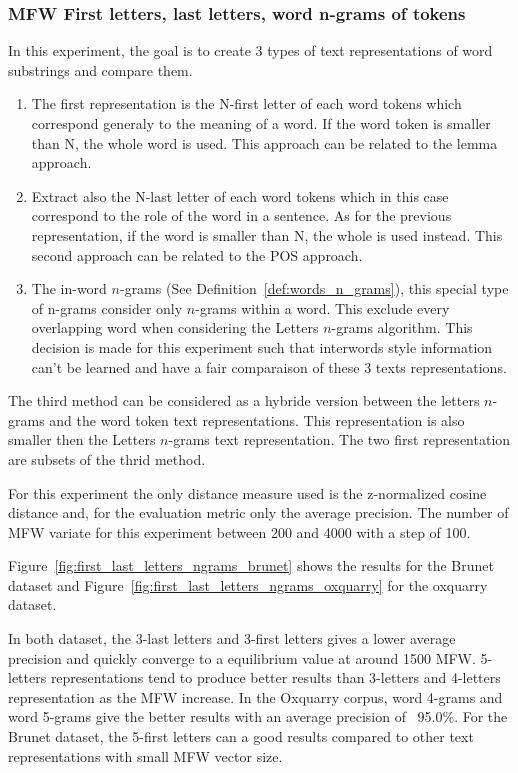 \subsubsection{MFW First letters, last letters, word n-grams of tokens}

In this experiment, the goal is to create 3 types of text representations of word substrings and compare them.

\begin{enumerate}
  \item
  The first representation is the N-first letter of each word tokens which correspond generaly to the meaning of a word.
  If the word token is smaller than N, the whole word is used.
  This approach can be related to the lemma approach.
  \item
  Extract also the N-last letter of each word tokens which in this case correspond to the role of the word in a sentence.
  As for the previous representation, if the word is smaller than N, the whole is used instead.
  This second approach can be related to the POS approach.
  \item
  The in-word $n$-grams (See Definition~\ref{def:words_n_grams}), this special type of n-grams consider only $n$-grams within a word.
  This exclude every overlapping word when considering the Letters $n$-grams algorithm.
  This decision is made for this experiment such that interwords style information can't be learned and have a fair comparaison of these 3 texts representations.
\end{enumerate}
The third method can be considered as a hybride version between the letters $n$-grams and the word token text representations.
This representation is also smaller then the Letters $n$-grams text representation.
The two first representation are subsets of the thrid method.

For this experiment the only distance measure used is the z-normalized cosine distance and, for the evaluation metric only the average precision.
The number of MFW variate for this experiment between 200 and 4000 with a step of 100.

Figure~\ref{fig:first_last_letters_ngrams_brunet} shows the results for the Brunet dataset and Figure~\ref{fig:first_last_letters_ngrams_oxquarry} for the oxquarry dataset.

In both dataset, the 3-last letters and 3-first letters gives a lower average precision and quickly converge to a equilibrium value at around 1500 MFW.
5-letters representations tend to produce better results than 3-letters and 4-letters representation as the MFW increase.
In the Oxquarry corpus, word 4-grams and word 5-grams give the better results with an average precision of ~95.0\%.
For the Brunet dataset, the 5-first letters can a good results compared to other text representations with small MFW vector size.

